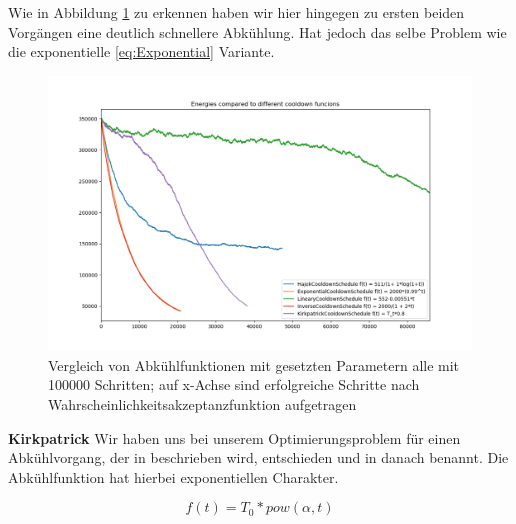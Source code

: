 Wie in Abbildung \ref{pic:Cool Down Comparisson} zu erkennen haben wir hier hingegen zu ersten beiden Vorgängen
eine deutlich schnellere Abkühlung. Hat jedoch das selbe Problem wie die exponentielle \ref{eq:Exponential} Variante.

\begin{figure}[H]
    \centering
    \includegraphics[width=\linewidth]{content/simulatedAnnealing/Bilder/Energy_Cooldown_compared_steps_85771.png}
    \caption{Vergleich von Abkühlfunktionen mit gesetzten Parametern
            alle mit 100000 Schritten; auf x-Achse sind erfolgreiche Schritte nach Wahrscheinlichkeitsakzeptanzfunktion
            aufgetragen}
    \label{pic:Cool Down Comparisson}
\end{figure}


\textbf{Kirkpatrick}
Wir haben uns bei unserem Optimierungsproblem für einen Abkühlvorgang, der in \cite{Kirkpatrick671} beschrieben wird, 
entschieden und in danach benannt. Die Abkühlfunktion hat hierbei exponentiellen Charakter. 

\begin{tcolorbox}[rightrule=3mm, rounded corners=east]
    \begin{equation}\label{eq:ExponentialKirkpatrick}
        f(t) = T_0 * pow(\alpha,t)
      \end{equation}
\end{tcolorbox}


